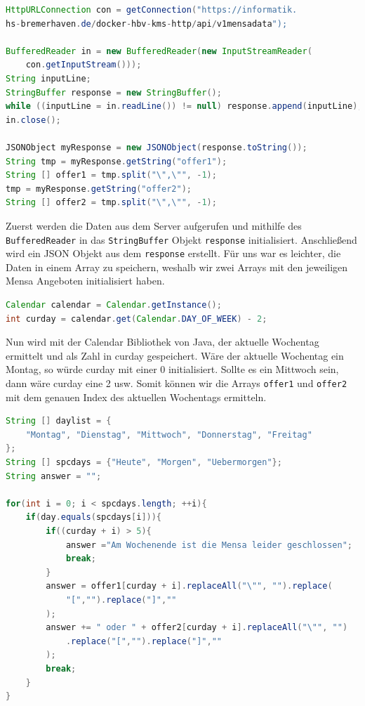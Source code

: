 \begin{lstlisting}[language=Java]
HttpURLConnection con = getConnection("https://informatik.
hs-bremerhaven.de/docker-hbv-kms-http/api/v1mensadata");

BufferedReader in = new BufferedReader(new InputStreamReader(
    con.getInputStream()));
String inputLine;
StringBuffer response = new StringBuffer();
while ((inputLine = in.readLine()) != null) response.append(inputLine); 
in.close();

JSONObject myResponse = new JSONObject(response.toString());
String tmp = myResponse.getString("offer1");
String [] offer1 = tmp.split("\",\"", -1);
tmp = myResponse.getString("offer2");
String [] offer2 = tmp.split("\",\"", -1); 
\end{lstlisting}

Zuerst werden die Daten aus dem Server aufgerufen und mithilfe des \verb|BufferedReader| in das \verb|StringBuffer| Objekt \verb|response| initialisiert. Anschließend wird ein JSON Objekt aus dem \verb|response| erstellt. Für uns war es leichter, die Daten in einem Array zu speichern, weshalb wir zwei Arrays mit den jeweiligen Mensa Angeboten initialisiert haben.\\

\begin{lstlisting}[language=Java]
Calendar calendar = Calendar.getInstance();
int curday = calendar.get(Calendar.DAY_OF_WEEK) - 2;    
\end{lstlisting}

Nun wird mit der Calendar Bibliothek von Java, der aktuelle Wochentag ermittelt und als Zahl in curday gespeichert. Wäre der aktuelle Wochentag ein Montag, so würde curday mit einer 0 initialisiert. Sollte es ein Mittwoch sein, dann wäre curday eine 2 usw. Somit können wir die Arrays \verb|offer1| und \verb|offer2| mit dem genauen Index des aktuellen Wochentags ermitteln.\\

\begin{lstlisting}[language=Java]
String [] daylist = {
    "Montag", "Dienstag", "Mittwoch", "Donnerstag", "Freitag"
};
String [] spcdays = {"Heute", "Morgen", "Uebermorgen"};
String answer = "";

for(int i = 0; i < spcdays.length; ++i){
    if(day.equals(spcdays[i])){
        if((curday + i) > 5){
            answer ="Am Wochenende ist die Mensa leider geschlossen";
            break;
        }
        answer = offer1[curday + i].replaceAll("\"", "").replace(
            "[","").replace("]",""
        );
        answer += " oder " + offer2[curday + i].replaceAll("\"", "")
            .replace("[","").replace("]",""
        );
        break;
    }
}    
\end{lstlisting}

